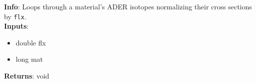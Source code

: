 \textbf{Info}: Loops through a material's ADER isotopes normalizing their 
cross sections by \texttt{flx}. \\

\noindent \textbf{Inputs}:
\begin{itemize}
\item{double flx}
\item{long mat}
\end{itemize}

\noindent \textbf{Returns}: void

